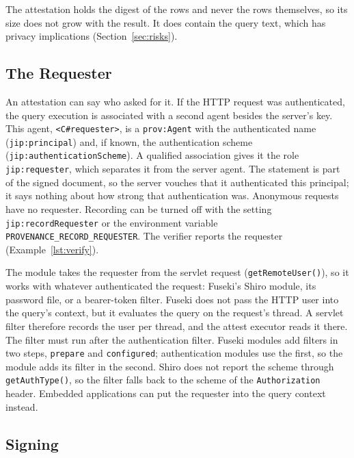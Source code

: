 \documentclass[11pt,a4paper]{article}
\newcommand{\code}[1]{\texttt{#1}}
\begin{document}
The attestation holds the digest of the rows and never the rows themselves, so its size
does not grow with the result. It does contain the query text, which has privacy implications
(Section~\ref{sec:risks}).

\subsection{The Requester}
\label{sec:requester}

An attestation can say who asked for it. If the HTTP request was authenticated, the query
execution is associated with a second agent besides the server's key. This agent,
\code{<C\#requester>}, is a \code{prov:Agent} with the authenticated name
(\code{jip:principal}) and, if known, the authentication scheme
(\code{jip:authenticationScheme}). A qualified association gives it the
role \code{jip:requester}, which separates it from the server agent. The statement is part of
the signed document, so the server vouches that it authenticated this principal; it says
nothing about how strong that authentication was. Anonymous requests have no requester.
Recording can be turned off with the setting \code{jip:recordRequester} or the environment
variable \code{PROVENANCE\_RECORD\_REQUESTER}. The verifier reports the requester (Example~\ref{lst:verify}).

The module takes the requester from the servlet request (\code{getRemoteUser()}), so it works
with whatever authenticated the request: Fuseki's Shiro module, its password file, or a
bearer-token filter. Fuseki does not pass the HTTP user into the query's context, but it
evaluates the query on the request's thread. A servlet filter therefore records the user per
thread, and the attest executor reads it there. The filter must run after the authentication filter.
Fuseki modules add filters in two steps, \code{prepare} and \code{configured}; authentication
modules use the first, so the module adds its filter in the second. Shiro does not report the
scheme through \code{getAuthType()}, so the filter falls back to the scheme of the
\code{Authorization} header. Embedded applications can put the requester into the query context
instead.

\subsection{Signing}
\label{sec:signing}
\end{document}
